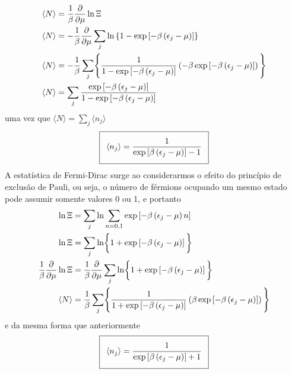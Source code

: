 \begin{prob}
\begin{sol}
    \begin{align}
      \begin{split}
        \langle N\rangle&=\frac{1}{\beta}\frac{\partial {}}{\partial {\mu}}\ln\Xi\\
        \langle N\rangle&=-\frac{1}{\beta}\frac{\partial {}}{\partial {\mu}}\sum_j\ln\left\{1-\exp{\left[-\beta\left(\epsilon_j -\mu\right)\right]}\right\}\\
        \langle N\rangle&=-\frac{1}{\beta}\sum_j\Biggr\{\frac{1}{1-\exp{\left[-\beta\left(\epsilon_j -\mu\right)\right]}}\left(-\beta\exp{\left[-\beta\left(\epsilon_j -\mu\right)\right]}\right)\Biggl\}\\
        \langle N\rangle&=\sum_j\frac{\exp{\left[-\beta\left(\epsilon_j -\mu\right)\right]}}{1-\exp{\left[-\beta\left(\epsilon_j -\mu\right)\right]}}
      \end{split}
    \end{align}
    uma vez que $\langle N\rangle=\sum_j\langle n_j\rangle$
    \begin{align}
      \addtolength{\fboxsep}{5pt}
      \boxed{
        \begin{gathered}
          \langle n_j\rangle=\frac{1}{\exp{\left[\beta\left(\epsilon_j -\mu\right)\right]}-1}
        \end{gathered}
      }
    \end{align}
    A estatística de Fermi-Dirac surge ao considerarmos o efeito do princípio de exclusão de Pauli, ou seja, o número de férmions ocupando um mesmo estado pode assumir somente valores 0 ou 1, e portanto
    \begin{align}
      \begin{split}
        \ln\Xi&=\sum_j\ln\sum_{n=0,1}\exp\left[-\beta\left(\epsilon_j-\mu\right)n\right]\\
        \ln\Xi&=\sum_j\ln\biggr\{1+\exp\left[-\beta\left(\epsilon_j-\mu\right)\right]\biggl\}\\
        \frac{1}{\beta}\frac{\partial {}}{\partial {\mu}}\ln\Xi&=\frac{1}{\beta}\frac{\partial {}}{\partial {\mu}}\sum_j\ln\biggr\{1+\exp\left[-\beta\left(\epsilon_j-\mu\right)\right]\biggl\}\\
        \langle N\rangle&=\frac{1}{\beta}\sum_j\Biggr\{\frac{1}{1+\exp{\left[-\beta\left(\epsilon_j -\mu\right)\right]}}\left(\beta\exp{\left[-\beta\left(\epsilon_j -\mu\right)\right]}\right)\Biggl\}
      \end{split}
    \end{align}
    e da mesma forma que anteriormente
    \begin{align}
      \addtolength{\fboxsep}{5pt}
      \boxed{
        \begin{gathered}
          \langle n_j\rangle=\frac{1}{\exp{\left[\beta\left(\epsilon_j -\mu\right)\right]}+1}
        \end{gathered}
      }
    \end{align}
  \end{sol}
\end{prob}
